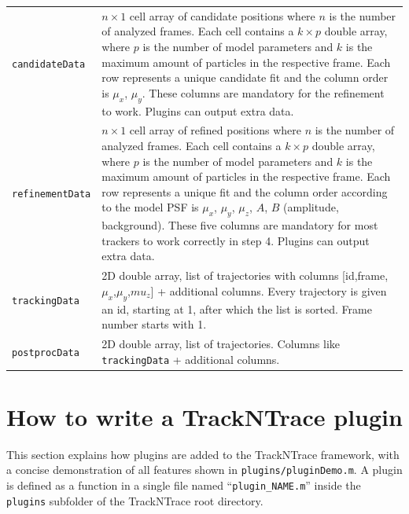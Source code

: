 \documentclass[11pt,onside]{report}
\numberwithin{equation}{chapter}
\begin{document}
\begin{table}[!h]
\begin{tabular}{p{} p{}}
\texttt{candidateData} & $n\times 1$ cell array of candidate positions where $n$ is the number of analyzed frames. Each cell contains a $k\times p$ double array, where $p$ is the number of model parameters and $k$ is the maximum amount of particles in the respective frame. Each row represents a unique candidate fit and the column order is $\mu_x$, $\mu_y$. These columns are mandatory for the refinement to work. Plugins can output extra data.\\
\texttt{refinementData} & $n\times 1$ cell array of refined positions where $n$ is the number of analyzed frames. Each cell contains a $k\times p$ double array, where $p$ is the number of model parameters and $k$ is the maximum amount of particles in the respective frame. Each row represents a unique fit and the column order according to the model PSF is $\mu_x$, $\mu_y$, $\mu_z$, $A$, $B$ (amplitude, background). These five columns are mandatory for most trackers to work correctly in step 4. Plugins can output extra data.\\
\texttt{trackingData} & 2D double array, list of trajectories with columns  [id,frame,$\mu_x$,$\mu_y$,$mu_z$] + additional columns. Every trajectory is given an id, starting at 1, after which the list is sorted. Frame number starts with 1.\\
\texttt{postprocData} & 2D double array, list of trajectories. Columns like \texttt{trackingData} + additional columns.\\
\bottomrule
\end{tabular}
\end{table}

\clearpage

\section{How to write a TrackNTrace plugin}\label{sec:howto_plugins}
This section explains how plugins are added to the TrackNTrace framework, with a concise demonstration of all features shown in \texttt{plugins/pluginDemo.m}. A plugin is defined as a function in a single file named ``\texttt{plugin\_NAME.m}'' inside the \texttt{plugins} subfolder of the TrackNTrace root directory. 
\end{document}
